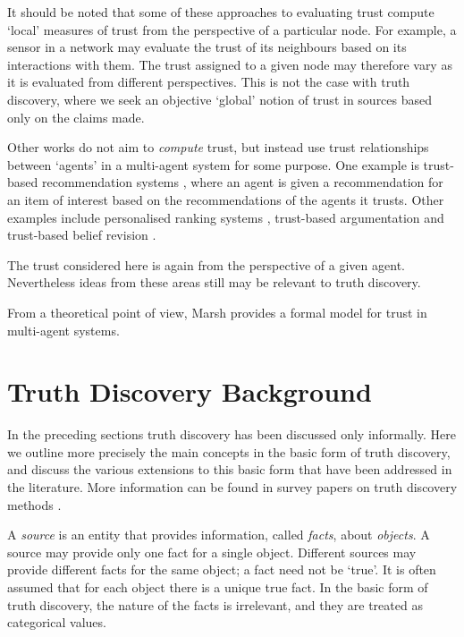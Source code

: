\documentclass[../main.tex]{subfiles}
\begin{document}
It should be noted that some of these approaches to evaluating trust compute
`local' measures of trust from the perspective of a particular node. For
example, a sensor in a network may evaluate the trust of its neighbours based
on its interactions with them. The trust assigned to a given node may therefore
vary as it is evaluated from different perspectives. This is not the case with
truth discovery, where we seek an objective `global' notion of trust in sources
based only on the claims made.

Other works do not aim to \emph{compute} trust, but instead use trust
relationships between `agents' in a multi-agent system for some purpose. One
example is trust-based recommendation systems \cite{andersen}, where an agent
is given a recommendation for an item of interest based on the recommendations
of the agents it trusts. Other examples include personalised ranking systems
\cite{altman_personalised}, trust-based argumentation \cite{tang} and
trust-based belief revision \cite{booth}.

The trust considered here is again from the perspective of a given agent.
Nevertheless ideas from these areas still may be relevant to truth discovery.

From a theoretical point of view, Marsh \cite{marsh} provides a formal model
for trust in multi-agent systems.

\section{Truth Discovery Background}
\label{sec:background_truth_discovery}

In the preceding sections truth discovery has been discussed only informally.
Here we outline more precisely the main concepts in the basic form of truth
discovery, and discuss the various extensions to this basic form that have been
addressed in the literature. More information can be found in survey papers on
truth discovery methods \cite{li_survey, gupta_han_survey}.

A \emph{source} is an entity that provides information, called \emph{facts},
about \emph{objects}. A source may provide only one fact for a single object.
Different sources may provide different facts for the same object; a fact need
not be `true'. It is often assumed that for each object there is a unique true
fact. In the basic form of truth discovery, the nature of the facts is
irrelevant, and they are treated as categorical values\footnotemark{}.
\end{document}
